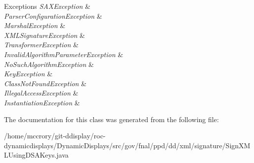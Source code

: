 \begin{DoxyExceptions}{Exceptions}
{\em S\-A\-X\-Exception} & \\
\hline
{\em Parser\-Configuration\-Exception} & \\
\hline
{\em Marshal\-Exception} & \\
\hline
{\em X\-M\-L\-Signature\-Exception} & \\
\hline
{\em Transformer\-Exception} & \\
\hline
{\em Invalid\-Algorithm\-Parameter\-Exception} & \\
\hline
{\em No\-Such\-Algorithm\-Exception} & \\
\hline
{\em Key\-Exception} & \\
\hline
{\em Class\-Not\-Found\-Exception} & \\
\hline
{\em Illegal\-Access\-Exception} & \\
\hline
{\em Instantiation\-Exception} & \\
\hline
\end{DoxyExceptions}


The documentation for this class was generated from the following file\-:\begin{DoxyCompactItemize}
\item 
/home/mccrory/git-\/ddisplay/roc-\/dynamicdisplays/\-Dynamic\-Displays/src/gov/fnal/ppd/dd/xml/signature/Sign\-X\-M\-L\-Using\-D\-S\-A\-Keys.\-java\end{DoxyCompactItemize}
